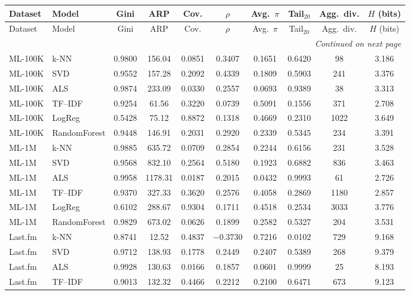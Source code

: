\documentclass[11pt,a4paper,twoside,openright]{report}
\begin{document}
{\footnotesize
\begin{longtable}{@{}llcccccccc@{}}
  \toprule
  Dataset & Model & Gini & ARP & Cov. & $\rho$ & Avg.~$\pi$ & Tail$_{20}$ & Agg.~div. & $H$ (bits) \\
  \midrule
  \endfirsthead
  \toprule
  Dataset & Model & Gini & ARP & Cov. & $\rho$ & Avg.~$\pi$ & Tail$_{20}$ & Agg.~div. & $H$ (bits) \\
  \midrule
  \endhead
  \midrule
  \multicolumn{10}{r}{\textit{Continued on next page}} \\
  \midrule
  \endfoot
  \bottomrule
  \endlastfoot
  ML-100K & k-NN & 0.9800 & 156.04 & 0.0851 & 0.3407 & 0.1651 & 0.6420 & 98 & 3.186 \\
  ML-100K & SVD & 0.9552 & 157.28 & 0.2092 & 0.4339 & 0.1809 & 0.5903 & 241 & 3.376 \\
  ML-100K & ALS & 0.9874 & 233.09 & 0.0330 & 0.2557 & 0.0693 & 0.9389 & 38 & 3.313 \\
  ML-100K & TF--IDF & 0.9254 & 61.56 & 0.3220 & 0.0739 & 0.5091 & 0.1556 & 371 & 2.708 \\
  ML-100K & LogReg & 0.5428 & 75.12 & 0.8872 & 0.1318 & 0.4669 & 0.2310 & 1022 & 3.649 \\
  ML-100K & RandomForest & 0.9448 & 146.91 & 0.2031 & 0.2920 & 0.2339 & 0.5345 & 234 & 3.391 \\
  \midrule
  ML-1M & k-NN & 0.9885 & 635.72 & 0.0709 & 0.2854 & 0.2244 & 0.6156 & 231 & 3.528 \\
  ML-1M & SVD & 0.9568 & 832.10 & 0.2564 & 0.5180 & 0.1923 & 0.6882 & 836 & 3.463 \\
  ML-1M & ALS & 0.9958 & 1178.31 & 0.0187 & 0.2015 & 0.0432 & 0.9993 & 61 & 2.726 \\
  ML-1M & TF--IDF & 0.9370 & 327.33 & 0.3620 & 0.2576 & 0.4058 & 0.2869 & 1180 & 2.857 \\
  ML-1M & LogReg & 0.6102 & 288.67 & 0.9304 & 0.1711 & 0.4518 & 0.2534 & 3033 & 3.776 \\
  ML-1M & RandomForest & 0.9829 & 673.02 & 0.0626 & 0.1899 & 0.2582 & 0.5327 & 204 & 3.531 \\
  \midrule
  Last.fm & k-NN & 0.8741 & 12.52 & 0.4837 & $-0.3730$ & 0.7216 & 0.0102 & 729 & 9.168 \\
  Last.fm & SVD & 0.9712 & 138.93 & 0.1778 & 0.2449 & 0.2407 & 0.5389 & 268 & 9.379 \\
  Last.fm & ALS & 0.9928 & 130.63 & 0.0166 & 0.1857 & 0.0601 & 0.9999 & 25 & 8.193 \\
  Last.fm & TF--IDF & 0.9013 & 132.32 & 0.4466 & 0.2212 & 0.2100 & 0.6471 & 673 & 9.123 \\

\end{longtable}}
\end{document}
